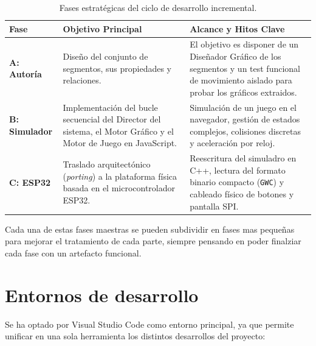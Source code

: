\documentclass[../main.tex]{subfiles}
\begin{document}
\begin{table}[H]
	\centering
	\small
	\begin{tabular}{@{} p{3.0cm} p{6.0cm} p{6.0cm} @{}}
		\toprule
		\textbf{Fase} & \textbf{Objetivo Principal} & \textbf{Alcance y Hitos Clave} \\ 
		\midrule
		\textbf{A: Autoría} & Diseño del conjunto de segmentos, sus propiedades y relaciones. & El objetivo es disponer de un Diseñador Gráfico de los segmentos y un test funcional de movimiento aislado para probar los gráficos extraidos. \\ 
		\addlinespace
		\textbf{B: Simulador} & Implementación del bucle secuencial del Director del sistema, el Motor Gráfico y el Motor de Juego en JavaScript. & Simulación de un juego en el navegador, gestión de estados complejos, colisiones discretas y aceleración por reloj. \\ 
		\addlinespace
		\textbf{C: ESP32} & Traslado arquitectónico (\textit{porting}) a la plataforma física basada en el microcontrolador ESP32. & Reescritura del simuladro en C++, lectura del formato binario compacto (\texttt{GWC}) y cableado físico de botones y pantalla SPI. \\ 
		\bottomrule
	\end{tabular}
	\caption{Fases estratégicas del ciclo de desarrollo incremental.}
	\label{tab:fases_proyecto}
\end{table}

Cada una de estas fases maestras se pueden subdividir en fases mas pequeñas para mejorar el tratamiento de cada parte, siempre pensando en poder finalziar cada fase con un artefacto funcional. 

	\section{Entornos de desarrollo}
	\label{sec:entornos-desarrollo}

	Se ha optado por Visual Studio Code como entorno principal, ya que permite unificar en una sola herramienta los distintos desarrollos del proyecto:
\end{document}

